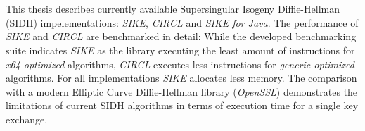 \chapter{\abstractname}

This thesis describes currently available Supersingular Isogeny Diffie-Hellman (SIDH) impelementations: \textit{SIKE}, \textit{CIRCL} and \textit{SIKE for Java}. 
The performance of \textit{SIKE} and \textit{CIRCL} are benchmarked in detail: 
While the developed benchmarking suite indicates \textit{SIKE} as the library executing the least amount of instructions for \textit{x64 optimized} algorithms, \textit{CIRCL} executes less instructions for \textit{generic optimized} algorithms. For all implementations \textit{SIKE} allocates less memory. The comparison with a modern Elliptic Curve Diffie-Hellman library (\textit{OpenSSL}) demonstrates the limitations of current SIDH algorithms in terms of execution time for a single key exchange.


